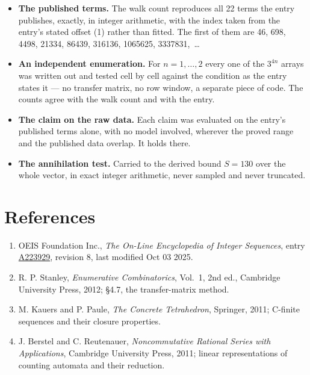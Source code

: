 \documentclass[11pt]{article}
\theoremstyle{definition}
\begin{document}
\begin{itemize}

\item {\bfseries The published terms.} The walk count reproduces all 22 terms the entry publishes, exactly, in integer arithmetic, with the index taken from the entry's stated offset (1) rather than fitted. The first of them are 46, 698, 4498, 21334, 86439, 316136, 1065625, 3337831,~\dots

\item {\bfseries An independent enumeration.} For $n = 1,\dots,2$ every one of the $3^{4n}$ arrays was written out and tested cell by cell against the condition as the entry states it --- no transfer matrix, no row window, a separate piece of code. The counts agree with the walk count and with the entry.

\item {\bfseries The claim on the raw data.} Each claim was evaluated on the entry's published terms alone, with no model involved, wherever the proved range and the published data overlap. It holds there.

\item {\bfseries The annihilation test.} Carried to the derived bound $S = 130$ over the whole vector, in exact integer arithmetic, never sampled and never truncated.

\end{itemize}

\section{References}

\begin{enumerate}

\item OEIS Foundation Inc., \emph{The On-Line Encyclopedia of Integer Sequences}, entry \href{https://oeis.org/A223929}{A223929}, revision 8, last modified Oct 03 2025.

\item R. P. Stanley, \emph{Enumerative Combinatorics}, Vol.~1, 2nd ed., Cambridge University Press, 2012; \S4.7, the transfer-matrix method.

\item M. Kauers and P. Paule, \emph{The Concrete Tetrahedron}, Springer, 2011; C-finite sequences and their closure properties.

\item J. Berstel and C. Reutenauer, \emph{Noncommutative Rational Series with Applications}, Cambridge University Press, 2011; linear representations of counting automata and their reduction.

\end{enumerate}
\end{document}

